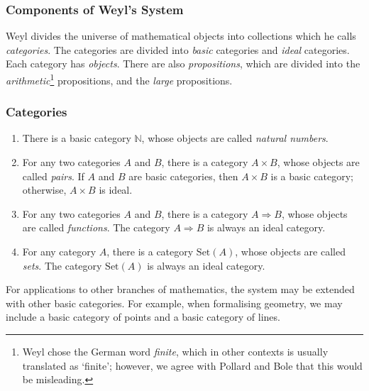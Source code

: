 \documentclass[acmtocl]{acmtrans2m}
\newcommand{\Set}[1]{\mathrm{Set} \left( {#1} \right)}
\newcommand{\boldarrow}{\Rightarrow}
\begin{document}
\subsubsection{Components of Weyl's System}

Weyl divides the universe of mathematical objects into collections which he calls \emph{categories}.  The categories are divided into \emph{basic} categories and \emph{ideal} categories.  Each category has \emph{objects}.
There are also \emph{propositions}, which are divided into the
\emph{arithmetic}\footnote{Weyl chose the German word \emph{finite}, which in other contexts is usually translated as `finite'; however, we agree with Pollard and Bole \cite{weyl:continuum} that this would be misleading.} propositions, and the \emph{large} propositions.

\subsubsection{Categories}
\begin{enumerate}
\item There is a basic category $\mathbb{N}$, whose objects are called \emph{natural numbers}.
\item For any two categories $A$ and $B$, there is a category $A \times B$, whose objects are called \emph{pairs}.  If $A$ and $B$ are basic categories, then $A \times B$ is a basic category; otherwise, $A \times B$ is ideal.
\item For any two categories $A$ and $B$, there is a category $A \boldarrow B$, whose objects are called \emph{functions}.  The category $A \boldarrow B$ is always an ideal category.
\item For any category $A$, there is a category $\Set{A}$, whose objects are called \emph{sets}.  The category $\Set{A}$ is always an ideal category.
\end{enumerate}
For applications to other branches of mathematics, the system may be extended with other basic categories.  For example, when formalising geometry, we may include a basic category of points and a basic category of lines.
\end{document}
